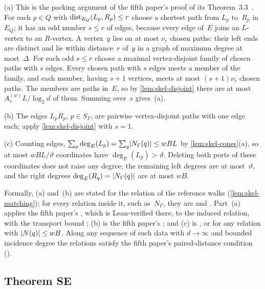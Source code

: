 \begin{outline}
(a) This is the packing argument of the fifth paper's proof of its Theorem~3.3~\cite{DirectedRecovery2026}. For each
$p\in Q$ with $\operatorname{dist}_{E_Q}(L_p,R_p)\le r$ choose a shortest path from $L_p$ to~$R_p$ in~$E_Q$; it has an odd number
$s\le r$ of edges, because every edge of~$E$ joins an $L$-vertex to an $R$-vertex. A vertex~$y$ lies on at most $\nu_r$
chosen paths: their left ends are distinct and lie within distance~$r$ of~$y$ in a graph of maximum degree at
most~$\Delta$. For each odd $s\le r$ choose a maximal vertex-disjoint family of chosen paths with $s$ edges. Every
chosen path with $s$ edges meets a member of the family, and each member, having $s+1$ vertices, meets at most
$(s+1)\nu_r$ chosen paths. The members are paths in~$E$, so by \cref{lem:skel-disjoint} there are at most
$A^{(w)}_sL/\log_2d$ of them. Summing over~$s$ gives~(a).

(b) The edges $L_pR_p$, $p\in S_\Gamma$, are pairwise vertex-disjoint paths with one edge each; apply
\cref{lem:skel-disjoint} with $s=1$.

(c) Counting edges, $\sum_p\deg_E(L_p)=\sum_q\lvert N_\Gamma(q) \rvert\le wBL$ by \cref{lem:skel-cones}(a), so at most
$wBL/\vartheta$ coordinates have $\deg_E(L_p)>\vartheta$. Deleting both ports of these coordinates does not raise any
degree; the remaining left degrees are at most~$\vartheta$, and the right degrees $\deg_E(R_q)=\lvert N_\Gamma(q) \rvert$ are
at most $wB$.

Formally, (a) and~(b) are stated for the relation  of the reference walks
(\cref{lem:skel-matching}); for every relation inside it, such as~$N_\Gamma$, they are
 and . Part~(a) applies the fifth paper's
, which is Lean-verified there, to the induced relation, with the
transport bound ; (b) is the fifth paper's
; and (c) is , or
 for any relation with $\lvert N(q) \rvert\le wB$. Along any sequence of such data with
$d\to\infty$ and bounded incidence degree the relations satisfy the fifth paper's paired-distance condition
().
\end{outline}

\subsection{Theorem SE}\label{sec:skel-SE}

